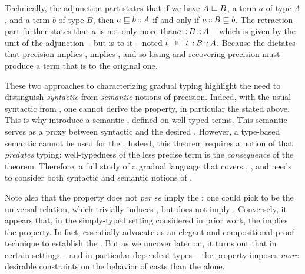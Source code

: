 Technically, the adjunction part states that if we have $A \sqsubseteq B$, a term $a$ of type $A$,
and a term $b$ of type $B$, then $a \sqsubseteq b \operatorname{\mathord{:}:} A$ if and only if $a \operatorname{\mathord{:}:} B \sqsubseteq b$.
%
\AP The retraction part further states that $a$ is not only more 
than$a \operatorname{\mathord{:}:} B \operatorname{\mathord{:}:} A$ – which is given by the unit of the adjunction –
but is  to it – noted $t \sqsupseteq\sqsubseteq t \operatorname{\mathord{:}:} B \operatorname{\mathord{:}:} A$.
Because the  dictates that precision implies ,
 implies ,
and so losing and recovering precision must produce a term that is  to the original one.

\AP These two approaches to characterizing gradual typing highlight
the need to distinguish
\emph{syntactic} from \emph{semantic} notions of precision.
Indeed, with the usual syntactic  from ,
one cannot derive the  property, in particular the  stated above.
This is why  introduce a semantic ,
defined on well-typed terms. This semantic  serves
as a proxy between syntactic  and the desired
.
%
However, a type-based semantic  cannot be used for the .
Indeed, this theorem%
requires a notion of  that \emph{predates} typing:
well-typedness of the less precise term is the \emph{consequence} of the theorem. 
Therefore, a full study of a gradual language that covers , , and
 needs to consider both syntactic and semantic
notions of .

Note also that the  property does not
\textit{per se} imply the : one could pick  to be the universal relation,
which trivially induces , but does not imply .
Conversely, it appears that, in the simply-typed setting considered in prior work,
the  implies the  property.
In fact, \textcite{New2018} essentially advocate  as an elegant and compositional
proof technique to establish the .
But as we uncover later on, it turns out that in certain settings – and in particular dependent types – the  property imposes \emph{more}
desirable constraints on the behavior of casts than the  alone.

